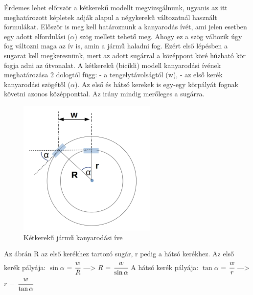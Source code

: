 

Érdemes lehet előrször a kétkerekű modellt megvizsgálnunk, ugyanis az itt meghatározott képletek adják alapul a négykerekű változatnál használt formulákat. Először is meg kell határoznunk a kanyarodás ívét, ami jelen esetben egy adott elfordulási ($\alpha$) szög mellett tehető meg. Ahogy ez a szög változik úgy fog változni maga az ív is, amin a jármű haladni fog. Ezért első lépésben a sugarat kell megkeresnünk, mert az adott sugárral a középpont köré húzható kör fogja adni az útvonalat. 
A kétkerekű (bicikli) modell kanyarodási ívének meghatározása 2 dologtól függ:\newline
\phantom{len} - a tengelytávolságtól (w),\newline
\phantom{len} - az első kerék kanyarodási szögétől ($\alpha$).\newline
Az első és hátsó kerekek is egy-egy körpályát fognak követni azonos középponttal. Az irány mindig merőleges a sugárra.

\begin{figure}[h!]
\centering
\includegraphics[scale=0.5]{images/two_wheels_rad.png}
\caption{Kétkerekű jármű kanyarodási íve}
\label{fig:two_wheels_rad}
\end{figure}
Az ábrán R az első kerékhez tartozó sugár, r pedig a hátsó kerékhez.\newline
Az első kerék pályája: $\sin\alpha$ = $\cfrac{w}{R}$ \hspace{5mm}---> \hspace{5mm} $R$ = $\cfrac{w}{\sin\alpha}$ \newline
A hátsó kerék pályája: $\tan\alpha$ = $\cfrac{w}{r}$ \hspace{5mm}---> \hspace{5mm} $r$ = $\cfrac{w}{\tan\alpha}$
\newpage

